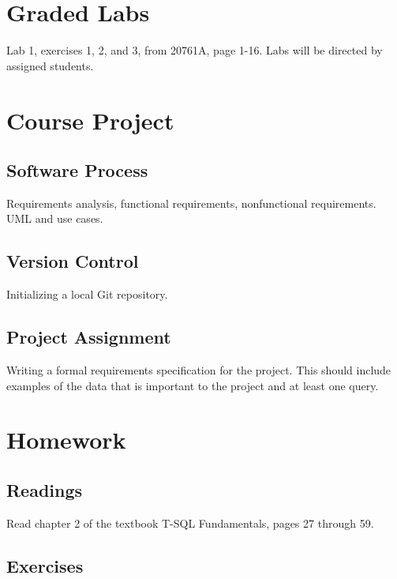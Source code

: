\documentclass{article}
\begin{document}
    \section{Graded Labs}

Lab 1, exercises 1, 2, and 3, from 20761A, page 1-16. Labs will be directed by assigned students.

    \section{Course Project}


        \subsection{Software Process}

        Requirements analysis, functional requirements, nonfunctional requirements. UML and use cases.
        
        \subsection{Version Control}

        Initializing a local Git repository.

        \subsection{Project Assignment}

        Writing a formal requirements specification for the project. This should include examples of the data that is important to the project and at least one query.

    \section{Homework}

        \subsection{Readings}

         Read chapter 2 of the textbook T-SQL Fundamentals, pages 27 through 59.

        \subsection{Exercises}
\end{document}
